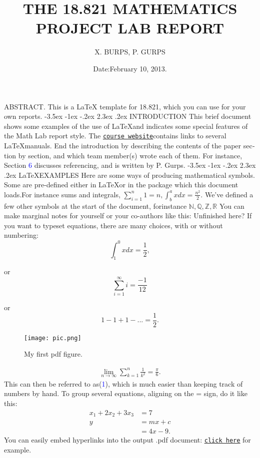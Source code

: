 \documentclass{article}
\title{\textbf{THE 18.821 MATHEMATICS PROJECT LAB REPORT
		\newline[REPLACE THIS WITH YOUR OWN SHORT DESCRIPTIVE TITLE!]}}
\author{X. BURPS, P. GURPS}
\date{}
\makeatletter
\renewcommand\section{\@startsection {section}{1}{\z@}%
	{-3.5ex \@plus -1ex \@minus -.2ex}%
	{2.3ex \@plus.2ex}%
	{\normalfont\Large}}
\makeatother
\begin{document}
	\maketitle
	ABSTRACT. This is a \LaTeX{} template for 18.821, which you can
	 use for your own reports.
	 \centering         \section{INTRODUCTION}
	This brief document shows some examples of the use of \LaTeX and
	indicates some special features of the Math Lab report style. The
	\texttt{\href{http://stellar.mit.edu/S/course/18/sp13/18.821/}{\underline{course website}}}contains links to several \LaTeX manuals.
	End the introduction by describing the contents of the paper sec­
	tion by section, and which team member(s) wrote each of them. For
	instance, Section \textcolor{blue}{6} discusses referencing, and is written by P. Gurps.
	\section{\LaTeX EXAMPLES}
	Here are some ways of producing mathematical symbols. Some are pre-deﬁned either in \LaTeX or in the
	package which this document loads.For instance sums and integrals, $ \sum_{i=1}^{n} 1=n ,\int^a_b xdx =\frac{n^2}{2}.$ We’ve deﬁned a few other symbols at the start of the document, forinstance $\mathbb{N,Q,Z,R}$ You can make marginal notes for yourself or your
	co-authors like this:	Unﬁnished here?
	If you want to typeset equations, there are many choices, with or
	without numbering:
\[	\int^0_1 xdx= \frac{1}{2}, \]
\raggedright 
or  
\[	\sum_{i=1}^{\infty}i=\frac{-1}{12} \]
\raggedright
or
\[  1-1+1-...=\frac{1}{2}.\]
\date{Date:February 10, 2013.}
\newpage
{}
\begin{figure}[h]
\centering
\texttt{[image: pic.png]}
\caption{My ﬁrst pdf ﬁgure.}
\label{fig:pic}
\end{figure}
\begin{align}
	\lim_{n \to \infty} \sum_{k=1}^{n} \frac{1}{k^2}=\frac{\pi}{6}.
\end{align} 
This can then be referred to as(\textcolor{blue}{1}), which is much easier than keeping
track of numbers by hand. To group several equations, aligning on the
= sign, do it like this:
\begin{align*}
	x_1 + 2x_2 + 3x_3 &= 7 \\
	y &= mx + c \\
	&= 4x - 9.
\end{align*}
You can easily embed hyperlinks into the output .pdf document:
\texttt{\href{http://stellar.mit.edu/S/course/18/sp13/18.821/}{\underline{click here}}} for example.
\end{document}
